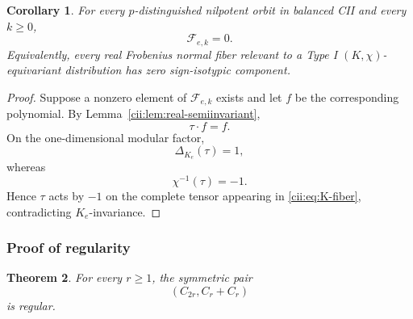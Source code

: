 \documentclass[10pt,a4paper]{amsart}
\numberwithin{equation}{section}
\newtheorem{theorem}{Theorem}[section]
\newtheorem{corollary}[theorem]{Corollary}
\begin{document}
\begin{corollary}\label{cii:cor:no-sign-fiber}
For every \(p\)-distinguished nilpotent orbit in balanced CII and every
\(k\geq0\),
\[
\mathcal F_{e,k}=0.
\]
Equivalently, every real Frobenius normal fiber relevant to a Type I
\((K,\chi)\)-equivariant distribution has zero sign-isotypic component.
\end{corollary}

\begin{proof}
Suppose a nonzero element of \(\mathcal F_{e,k}\) exists and let \(f\) be
the corresponding polynomial.  By
Lemma~\ref{cii:lem:real-semiinvariant},
\[
\tau\cdot f=f.
\]
On the one-dimensional modular factor,
\[
\Delta_{K_e}(\tau)=1,
\]
whereas
\[
\chi^{-1}(\tau)=-1.
\]
Hence \(\tau\) acts by \(-1\) on the complete tensor appearing in
\eqref{cii:eq:K-fiber}, contradicting \(K_e\)-invariance.
\end{proof}


\subsubsection{Proof of regularity}

\begin{theorem}\label{cii:thm:regular}
For every \(r\geq1\), the symmetric pair
\[
(C_{2r},C_r+C_r)
\]
is regular.
\end{theorem}
\end{document}
